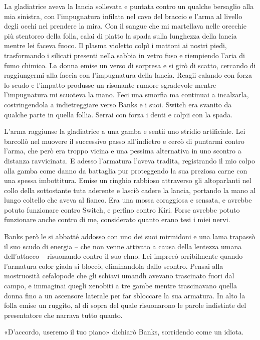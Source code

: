 La gladiatrice aveva la lancia sollevata e puntata contro un qualche
bersaglio alla mia sinistra, con l'impugnatura infilata nel cavo del
braccio e l'arma al livello degli occhi nel prendere la mira. Con il
sangue che mi martellava nelle orecchie più stentoreo della folla, calai
di piatto la spada sulla lunghezza della lancia mentre lei faceva fuoco.
Il plasma violetto colpì i mattoni ai nostri piedi, trasformando i
silicati presenti nella sabbia in vetro fuso e riempiendo l'aria di fumo
chimico. La donna emise un verso di sorpresa e si girò di scatto,
cercando di raggiungermi alla faccia con l'impugnatura della lancia.
Reagii calando con forza lo scudo e l'impatto produsse un risonante
rumore sgradevole mentre l'impugnatura mi scuoteva la mano. Feci una
smorfia ma continuai a incalzarla, costringendola a indietreggiare verso
Banks e i suoi. Switch era svanito da qualche parte in quella follia.
Serrai con forza i denti e colpii con la spada.

L'arma raggiunse la gladiatrice a una gamba e sentii uno stridio
artificiale. Lei barcollò nel muovere il successivo passo all'indietro e
cercò di puntarmi contro l'arma, che però era troppo vicina e una
pessima alternativa in uno scontro a distanza ravvicinata. E adesso
l'armatura l'aveva tradita, registrando il mio colpo alla gamba come
danno da battaglia pur proteggendo la sua preziosa carne con una spessa
imbottitura. Emise un ringhio rabbioso attraverso gli altoparlanti nel
collo della sottostante tuta aderente e lasciò cadere la lancia,
portando la mano al lungo coltello che aveva al fianco. Era una mossa
coraggiosa e sensata, e avrebbe potuto funzionare contro Switch, e
perfino contro Kiri. Forse avrebbe potuto funzionare anche contro di me,
considerato quanto erano tesi i miei nervi.

Banks però le si abbatté addosso con uno dei suoi mirmidoni e una lama
trapassò il suo scudo di energia -- che non venne attivato a causa della
lentezza umana dell'attacco -- risuonando contro il suo elmo. Lei
imprecò orribilmente quando l'armatura color giada si bloccò,
eliminandola dallo scontro. Pensai alla mostruosità cefalopode che gli
schiavi umandh avevano trascinato fuori dal campo, e immaginai quegli
xenobiti a tre gambe mentre trascinavano quella donna fino a un
ascensore laterale per far sbloccare la sua armatura. In alto la folla
emise un ruggito, al di sopra del quale risuonarono le parole indistinte
del presentatore che narrava tutto quanto.

«D'accordo, useremo il tuo piano» dichiarò Banks, sorridendo come un
idiota.

